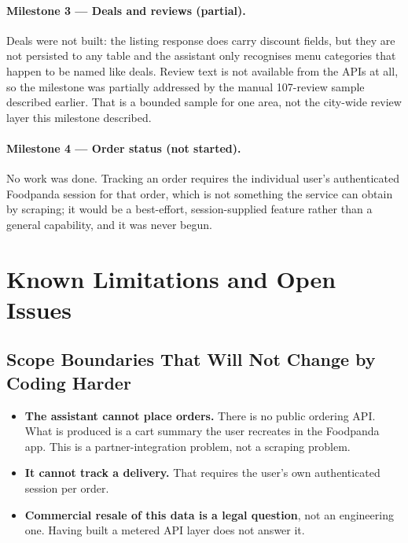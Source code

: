 \documentclass[11pt,a4paper]{article}
\begin{document}
\paragraph{Milestone 3 --- Deals and reviews (partial).}
Deals were not built: the listing response does carry discount fields, but they
are not persisted to any table and the assistant only recognises menu
categories that happen to be named like deals. Review text is not available
from the APIs at all, so the milestone was partially addressed by the manual
107-review sample described earlier. That is a bounded sample for one area, not
the city-wide review layer this milestone described.

\paragraph{Milestone 4 --- Order status (not started).}
No work was done. Tracking an order requires the individual user's
authenticated Foodpanda session for that order, which is not something the
service can obtain by scraping; it would be a best-effort, session-supplied
feature rather than a general capability, and it was never begun.

\section{Known Limitations and Open Issues}
\label{sec:limits}

\subsection{Scope Boundaries That Will Not Change by Coding Harder}

\begin{itemize}[itemsep=3pt,topsep=4pt]
\item \textbf{The assistant cannot place orders.} There is no public ordering
      API. What is produced is a cart summary the user recreates in the
      Foodpanda app. This is a partner-integration problem, not a scraping
      problem.
\item \textbf{It cannot track a delivery.} That requires the user's own
      authenticated session per order.
\item \textbf{Commercial resale of this data is a legal question}, not an
      engineering one. Having built a metered API layer does not answer it.
\end{itemize}
\end{document}
